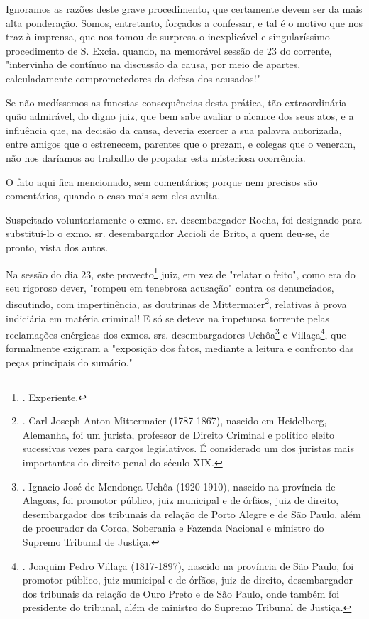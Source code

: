 Ignoramos as razões deste grave procedimento, que certamente devem ser
da mais alta ponderação. Somos, entretanto, forçados a confessar, e tal
é o motivo que nos traz à imprensa, que nos tomou de surpresa o
inexplicável e singularíssimo procedimento de S. Excia. quando, na
memorável sessão de 23 do corrente, "intervinha de contínuo na discussão
da causa, por meio de apartes, calculadamente comprometedores da defesa
dos acusados!"

Se não medíssemos as funestas consequências desta prática, tão
extraordinária quão admirável, do digno juiz, que bem sabe avaliar o
alcance dos seus atos, e a influência que, na decisão da causa, deveria
exercer a sua palavra autorizada, entre amigos que o estrenecem,
parentes que o prezam, e colegas que o veneram, não nos daríamos ao
trabalho de propalar esta misteriosa ocorrência.

O fato aqui fica mencionado, sem comentários; porque nem precisos são
comentários, quando o caso mais sem eles avulta.

Suspeitado voluntariamente o exmo. sr. desembargador Rocha, foi
designado para substituí-lo o exmo. sr. desembargador Accioli de Brito,
a quem deu-se, de pronto, vista dos autos.

Na sessão do dia 23, este provecto\footnote{. Experiente.} juiz, em vez
de "relatar o feito", como era do seu rigoroso dever, "rompeu em
tenebrosa acusação" contra os denunciados, discutindo, com
impertinência, as doutrinas de Mittermaier\footnote{. Carl Joseph Anton
  Mittermaier (1787-1867), nascido em Heidelberg, Alemanha, foi um
  jurista, professor de Direito Criminal e político eleito sucessivas
  vezes para cargos legislativos. É considerado um dos juristas mais
  importantes do direito penal do século XIX.}, relativas à prova
indiciária em matéria criminal! E só se deteve na impetuosa torrente
pelas reclamações enérgicas dos exmos. srs. desembargadores
Uchôa\footnote{. Ignacio José de Mendonça Uchôa (1920-1910), nascido na
  província de Alagoas, foi promotor público, juiz municipal e de
  órfãos, juiz de direito, desembargador dos tribunais da relação de
  Porto Alegre e de São Paulo, além de procurador da Coroa, Soberania e
  Fazenda Nacional e ministro do Supremo Tribunal de Justiça.} e
Villaça\footnote{. Joaquim Pedro Villaça (1817-1897), nascido na
  província de São Paulo, foi promotor público, juiz municipal e de
  órfãos, juiz de direito, desembargador dos tribunais da relação de
  Ouro Preto e de São Paulo, onde também foi presidente do tribunal,
  além de ministro do Supremo Tribunal de Justiça.}, que formalmente
exigiram a "exposição dos fatos, mediante a leitura e confronto das
peças principais do sumário."

